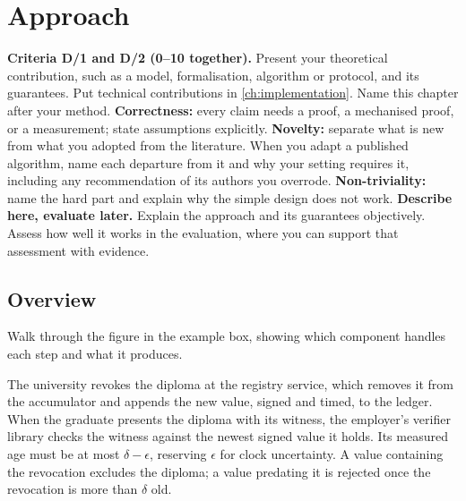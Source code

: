 \section{Approach}\label{guide:chapters:approach}
\textbf{Criteria D/1 and D/2 (0--10 together).} Present your theoretical contribution, such as a model, formalisation, algorithm or protocol, and its guarantees. Put technical contributions in \cref{ch:implementation}. Name this chapter after your method.
\textbf{Correctness:} every claim needs a proof, a mechanised proof, or a measurement; state assumptions explicitly.
\textbf{Novelty:} separate what is new from what you adopted from the literature. When you adapt a published algorithm, name each departure from it and why your setting requires it, including any recommendation of its authors you overrode.
\textbf{Non-triviality:} name the hard part and explain why the simple design does not work.
\textbf{Describe here, evaluate later.} Explain the approach and its guarantees objectively. Assess how well it works in the evaluation, where you can support that assessment with evidence.

\subsection[Overview]{Overview\skimmark}\label{guide:chapters:overview}
Walk through the figure in the example box, showing which component handles each step and what it produces.
\begin{runningexample}
The university revokes the diploma at the registry service, which removes it from the accumulator and appends the new value, signed and timed, to the ledger. When the graduate presents the diploma with its witness, the employer's verifier library checks the witness against the newest signed value it holds. Its measured age must be at most $\delta-\epsilon$, reserving $\epsilon$ for clock uncertainty. A value containing the revocation excludes the diploma; a value predating it is rejected once the revocation is more than $\delta$ old.
\end{runningexample}

